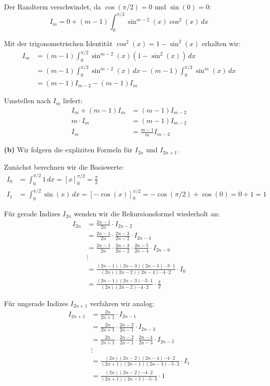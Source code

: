 \documentclass{article}
\begin{document}
Der Randterm verschwindet, da $\cos(\pi/2) = 0$ und $\sin(0) = 0$:
$$I_m = 0 + (m-1)\int_0^{\pi/2} \sin^{m-2}(x)\cos^2(x) \, dx$$

Mit der trigonometrischen Identität $\cos^2(x) = 1 - \sin^2(x)$ erhalten wir:
\begin{align*}
I_m &= (m-1)\int_0^{\pi/2} \sin^{m-2}(x)(1-\sin^2(x)) \, dx\\
&= (m-1)\int_0^{\pi/2} \sin^{m-2}(x) \, dx - (m-1)\int_0^{\pi/2} \sin^m(x) \, dx\\
&= (m-1)I_{m-2} - (m-1)I_m
\end{align*}

Umstellen nach $I_m$ liefert:
\begin{align*}
I_m + (m-1)I_m &= (m-1)I_{m-2}\\
m \cdot I_m &= (m-1)I_{m-2}\\
I_m &= \frac{m-1}{m}I_{m-2}
\end{align*}

\textbf{(b)} Wir folgern die expliziten Formeln für $I_{2n}$ und $I_{2n+1}$.

Zunächst berechnen wir die Basiswerte:
\begin{align*}
I_0 &= \int_0^{\pi/2} 1 \, dx = \left[x\right]_0^{\pi/2} = \frac{\pi}{2}\\
I_1 &= \int_0^{\pi/2} \sin(x) \, dx = \left[-\cos(x)\right]_0^{\pi/2} = -\cos(\pi/2) + \cos(0) = 0 + 1 = 1
\end{align*}

Für gerade Indizes $I_{2n}$ wenden wir die Rekursionsformel wiederholt an:
\begin{align*}
I_{2n} &= \frac{2n-1}{2n} \cdot I_{2n-2}\\
&= \frac{2n-1}{2n} \cdot \frac{2n-3}{2n-2} \cdot I_{2n-4}\\
&= \frac{2n-1}{2n} \cdot \frac{2n-3}{2n-2} \cdot \frac{2n-5}{2n-4} \cdot I_{2n-6}\\
&\vdots\\
&= \frac{(2n-1)(2n-3)(2n-5)\cdots 3 \cdot 1}{(2n)(2n-2)(2n-4)\cdots 4 \cdot 2} \cdot I_0\\
&= \frac{(2n-1)(2n-3)\cdots 3 \cdot 1}{(2n)(2n-2)\cdots 4 \cdot 2} \cdot \frac{\pi}{2}
\end{align*}

Für ungerade Indizes $I_{2n+1}$ verfahren wir analog:
\begin{align*}
I_{2n+1} &= \frac{2n}{2n+1} \cdot I_{2n-1}\\
&= \frac{2n}{2n+1} \cdot \frac{2n-2}{2n-1} \cdot I_{2n-3}\\
&= \frac{2n}{2n+1} \cdot \frac{2n-2}{2n-1} \cdot \frac{2n-4}{2n-3} \cdot I_{2n-5}\\
&\vdots\\
&= \frac{(2n)(2n-2)(2n-4)\cdots 4 \cdot 2}{(2n+1)(2n-1)(2n-3)\cdots 5 \cdot 3} \cdot I_1\\
&= \frac{(2n)(2n-2)\cdots 4 \cdot 2}{(2n+1)(2n-1)\cdots 5 \cdot 3} \cdot 1
\end{align*}
\end{document}
